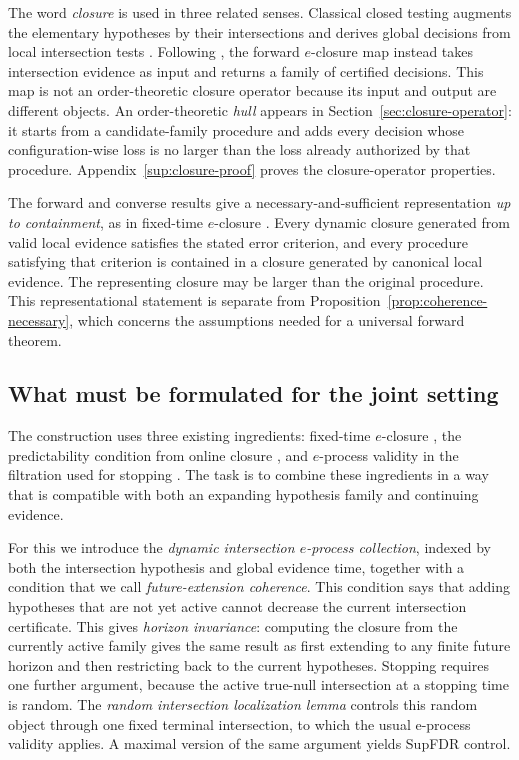 \documentclass[11pt]{article}
\numberwithin{equation}{section}
\theoremstyle{plain}
\theoremstyle{definition}
\begin{document}
The word \emph{closure} is used in three related senses. Classical closed testing augments the elementary hypotheses by their intersections and derives global decisions from local intersection tests \citep{MarcusPeritzGabriel1976}. Following \citet{XuEtAl2026Closure}, the forward $e$-closure map instead takes intersection evidence as input and returns a family of certified decisions. This map is not an order-theoretic closure operator because its input and output are different objects. An order-theoretic \emph{hull} appears in Section~\ref{sec:closure-operator}: it starts from a candidate-family procedure and adds every decision whose configuration-wise loss is no larger than the loss already authorized by that procedure. Appendix~\ref{sup:closure-proof} proves the closure-operator properties.

The forward and converse results give a necessary-and-sufficient representation \emph{up to containment}, as in fixed-time $e$-closure \citep{XuEtAl2026Closure}. Every dynamic closure generated from valid local evidence satisfies the stated error criterion, and every procedure satisfying that criterion is contained in a closure generated by canonical local evidence. The representing closure may be larger than the original procedure. This representational statement is separate from Proposition~\ref{prop:coherence-necessary}, which concerns the assumptions needed for a universal forward theorem.

\subsection{What must be formulated for the joint setting}\label{sec:ingredients}

The construction uses three existing ingredients: fixed-time $e$-closure \citep{XuEtAl2026Closure}, the predictability condition from online closure \citep{FischerBofillBrannath2024}, and $e$-process validity in the filtration used for stopping \citep{WangDandapanthulaRamdas2025}. The task is to combine these ingredients in a way that is compatible with
both an expanding hypothesis family and continuing evidence.

For this we introduce the \emph{dynamic intersection $e$-process collection},  indexed by both the intersection hypothesis and global evidence time, together with a condition that we call \emph{future-extension coherence}. This condition says that adding hypotheses that are not yet active cannot decrease the current intersection certificate. This gives \emph{horizon invariance}: computing the closure
from the currently active family gives the same result as first extending to any finite future horizon
and then restricting back to the current hypotheses. Stopping requires one further argument,
because the active true-null intersection at a stopping time is random. The \emph{random intersection localization lemma} controls this random object through one fixed terminal intersection, to which
the usual e-process validity applies. A maximal version of the same argument yields SupFDR
control.
\end{document}
